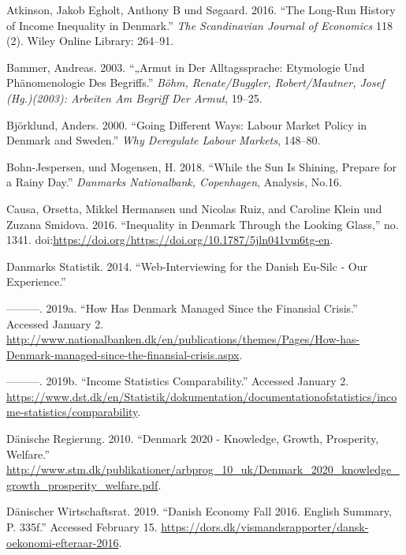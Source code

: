 \documentclass[12pt,]{article}
\begin{document}
\hypertarget{refs}{}
\hypertarget{ref-atkinson2016long}{}
Atkinson, Jakob Egholt, Anthony B und Søgaard. 2016. ``The Long-Run
History of Income Inequality in Denmark.'' \emph{The Scandinavian
Journal of Economics} 118 (2). Wiley Online Library: 264--91.

\hypertarget{ref-bammer2003armut}{}
Bammer, Andreas. 2003. ``„Armut in Der Alltagssprache: Etymologie Und
Phänomenologie Des Begriffs.'' \emph{Böhm, Renate/Buggler,
Robert/Mautner, Josef (Hg.)(2003): Arbeiten Am Begriff Der Armut},
19--25.

\hypertarget{ref-bjorklund2000going}{}
Björklund, Anders. 2000. ``Going Different Ways: Labour Market Policy in
Denmark and Sweden.'' \emph{Why Deregulate Labour Markets}, 148--80.

\hypertarget{ref-Jespersen}{}
Bohn-Jespersen, und Mogensen, H. 2018. ``While the Sun Is Shining,
Prepare for a Rainy Day.'' \emph{Danmarks Nationalbank, Copenhagen},
Analysis, No.16.

\hypertarget{ref-causa2016inequality}{}
Causa, Orsetta, Mikkel Hermansen und Nicolas Ruiz, and Caroline Klein
und Zuzana Smidova. 2016. ``Inequality in Denmark Through the Looking
Glass,'' no. 1341.
doi:\href{https://doi.org/https://doi.org/https://doi.org/10.1787/5jln041vm6tg-en}{https://doi.org/https://doi.org/10.1787/5jln041vm6tg-en}.

\hypertarget{ref-cawistat}{}
Danmarks Statistik. 2014. ``Web-Interviewing for the Danish Eu-Silc -
Our Experience.''

\hypertarget{ref-statdenm2}{}
---------. 2019a. ``How Has Denmark Managed Since the Finansial
Crisis.'' Accessed January 2.
\url{http://www.nationalbanken.dk/en/publications/themes/Pages/How-has-Denmark-managed-since-the-finansial-crisis.aspx}.

\hypertarget{ref-statdenm}{}
---------. 2019b. ``Income Statistics Comparability.'' Accessed January
2.
\url{https://www.dst.dk/en/Statistik/dokumentation/documentationofstatistics/income-statistics/comparability}.

\hypertarget{ref-denmark2020}{}
Dänische Regierung. 2010. ``Denmark 2020 - Knowledge, Growth,
Prosperity, Welfare.''
\url{http://www.stm.dk/publikationer/arbprog_10_uk/Denmark_2020_knowledge_growth_prosperity_welfare.pdf}.

\hypertarget{ref-danski}{}
Dänischer Wirtschaftsrat. 2019. ``Danish Economy Fall 2016. English
Summary, P. 335f.'' Accessed February 15.
\url{https://dors.dk/vismandsrapporter/dansk-oekonomi-efteraar-2016}.
\end{document}
